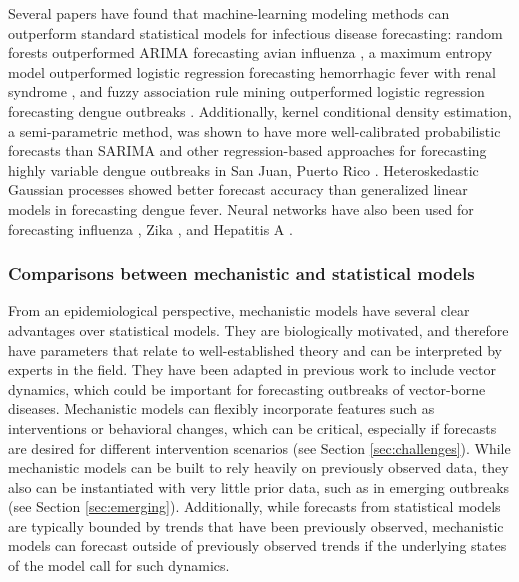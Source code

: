 \documentclass[a4paper]{article}
\begin{document}
Several papers have found that machine-learning modeling methods can outperform standard statistical models for infectious disease forecasting: random forests outperformed ARIMA forecasting avian influenza \cite{Kane2014}, a maximum entropy model outperformed logistic regression forecasting hemorrhagic fever with renal syndrome \cite{Liu2014}, and fuzzy association rule mining outperformed logistic regression forecasting dengue outbreaks \cite{Buczak2012}.
Additionally, kernel conditional density estimation, a semi-parametric method, was shown to have more well-calibrated probabilistic forecasts than SARIMA and other regression-based approaches for forecasting highly variable dengue outbreaks in San Juan, Puerto Rico \cite{Ray2017}.
Heteroskedastic Gaussian processes showed better forecast accuracy than generalized linear models in forecasting dengue fever.\cite{johnson2018phenomenological}
Neural networks have also been used for forecasting influenza \cite{xu2017forecasting,wu2018deep}, Zika \cite{akhtar2018dynamic}, and Hepatitis A \cite{guan2004forecasting}.

\subsubsection{Comparisons between mechanistic and statistical models}

From an epidemiological perspective, mechanistic models have several clear advantages over statistical models. 
They are biologically motivated, and therefore have parameters that relate to well-established theory and can be interpreted by experts in the field.
They have been adapted in previous work to include vector dynamics, which could be important for forecasting outbreaks of vector-borne diseases.\cite{lourencco20142012,reiner2013systematic,jewell2015bayesian} 
Mechanistic models can flexibly incorporate features such as interventions or behavioral changes, which can be critical, especially if forecasts are desired for different intervention scenarios (see Section \ref{sec:challenges}).
While mechanistic models can be built to rely heavily on previously observed data, they also can be instantiated with very little prior data, such as in emerging outbreaks (see Section \ref{sec:emerging}).
Additionally, while forecasts from statistical models are typically bounded by trends that have been previously observed, mechanistic models can forecast outside of previously observed trends if the underlying states of the model call for such dynamics.
\end{document}
